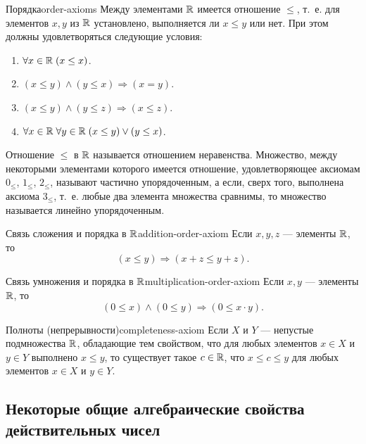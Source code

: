 \begin{axiom}{Порядка}{order-axioms}
  Между элементами $\mathbb{R}$ имеется отношение
  $\le$, т.~е. для элементов $x,y$ из $\mathbb{R}$ установлено, выполняется ли
  $x\le y$ или нет. При этом должны удовлетворяться следующие условия:
  \begin{enumerate}[leftmargin=3em]
    \item[$0_{\le}$.] $\forall x\in\mathbb{R}\;(x\le x)$.\par
    \item[$1_{\le}$.] $(x\le y)\land(y\le x)\Rightarrow(x=y)$.\par
    \item[$2_{\le}$.] $(x\le y)\land(y\le z)\Rightarrow(x\le z)$.\par
    \item[$3_{\le}$.] $\forall x\in\mathbb{R}\;\forall y\in\mathbb{R}\;(x\le y)\lor(y\le x)$.
  \end{enumerate}

  Отношение $\le$ в $\mathbb{R}$ называется отношением неравенства. Множество,
  между некоторыми элементами которого имеется отношение, удовлетворяющее
  аксиомам $0_{\le}$, $1_{\le}$, $2_{\le}$, называют частично упорядоченным,
  а если, сверх того, выполнена аксиома $3_{\le}$, т.~е. любые два элемента
  множества сравнимы, то множество называется линейно упорядоченным.
\end{axiom}

\begin{axiom}{Связь сложения и порядка в $\mathbb{R}$}{addition-order-axiom}
  Если $x,y,z$ — элементы $\mathbb{R}$, то
  \[
    (x\le y)\Rightarrow(x+z\le y+z).
  \]
\end{axiom}

\begin{axiom}{Связь умножения и порядка в $\mathbb{R}$}{multiplication-order-axiom}
  Если $x,y$ — элементы $\mathbb{R}$, то
  \[
    (0\le x)\land(0\le y)\Rightarrow(0\le x\cdot y).
  \]
\end{axiom}

\begin{axiom}{Полноты (непрерывности)}{completeness-axiom}
  Если $X$ и $Y$ — непустые
  подмножества $\mathbb{R}$, обладающие тем свойством, что для любых элементов
  $x\in X$ и $y\in Y$ выполнено $x\le y$, то существует такое $c\in\mathbb{R}$,
  что $x\le c\le y$ для любых элементов $x\in X$ и $y\in Y$.
\end{axiom}

\subsection{Некоторые общие алгебраические свойства действительных чисел}

